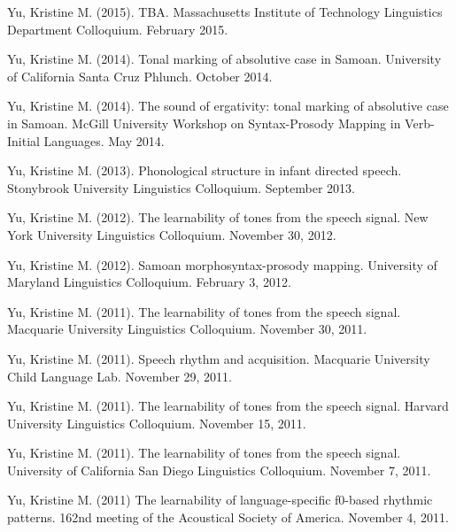 \documentclass[10pt]{article}
\begin{document}
\begin{bibenum}

    \item Yu, Kristine M. (2015). TBA. Massachusetts Institute of
      Technology Linguistics Department Colloquium. February 2015.

    \item Yu, Kristine M. (2014). Tonal marking of absolutive case in
      Samoan. University of California Santa Cruz Phlunch. October 2014.

    \item Yu, Kristine M. (2014). The sound of ergativity: tonal
      marking of absolutive case in Samoan. McGill University Workshop
      on Syntax-Prosody Mapping in Verb-Initial Languages. May 2014.

    \item Yu, Kristine M. (2013). Phonological structure in infant
      directed speech. Stonybrook University Linguistics Colloquium. September 2013.

    \item Yu, Kristine M. (2012). The learnability of tones from the
      speech signal. New York University Linguistics Colloquium. November 30, 2012. 

    \item Yu, Kristine M. (2012). Samoan morphosyntax-prosody
      mapping. University of Maryland Linguistics Colloquium. February
      3, 2012.

    \item Yu, Kristine M. (2011). The learnability of tones from the
      speech signal. Macquarie University Linguistics
      Colloquium. November 30, 2011.  

    \item Yu, Kristine M. (2011). Speech rhythm and
      acquisition. Macquarie University Child Language Lab. November 29, 2011. 

    \item Yu, Kristine M. (2011). The learnability of tones from the
      speech signal. Harvard University Linguistics
      Colloquium. November 15, 2011.

    \item Yu, Kristine M. (2011). The learnability of tones from the
      speech signal. University of California San Diego Linguistics
      Colloquium. November 7, 2011. 

    \item Yu, Kristine M. (2011) The learnability of language-specific
      f0-based rhythmic patterns. 162nd meeting of the Acoustical
      Society of America. November 4, 2011. 


\end{bibenum}
\end{document}
